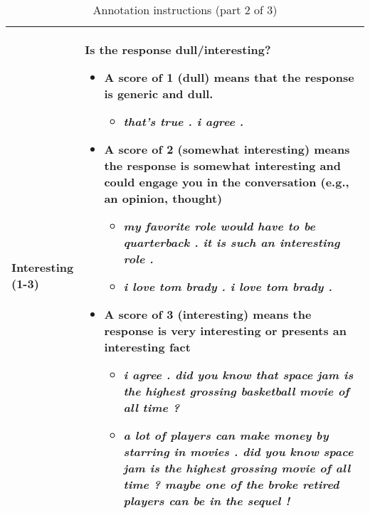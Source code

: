\documentclass[11pt,a4paper]{article}
\begin{document}
\begin{table*}
\begin{tabular}{|p{0.1\linewidth}|p{0.9\linewidth}|}
  
        Interesting (1-3) &  Is the response dull/interesting?
        \begin{itemize}
            \item A score of 1 (dull) means that the response is generic and dull. \begin{itemize}
                \item \textit{that’s true . i agree .}
                \end{itemize}
            \item A score of 2 (somewhat interesting) means the response is somewhat interesting and could engage you in the conversation (e.g., an opinion, thought)
            \begin{itemize}
                \item \textit{my favorite role would have to be quarterback . it is such an interesting role .}
                \item \textit{i love tom brady . i love tom brady .}
            \end{itemize}
            \item A score of 3 (interesting) means the response is very interesting or presents an interesting fact \begin{itemize}
                \item \textit{i agree . did you know that space jam is the highest grossing basketball movie of all time ?}
                \item \textit{a lot of players can make money by starring in movies . did you know space jam is the highest grossing movie of all time ? maybe one of the broke retired players can be in the sequel !}
            \end{itemize}            
        \end{itemize} \\ \hline

    \end{tabular}
    \caption{Annotation instructions (part 2 of 3)}
\end{table*}
\end{document}
